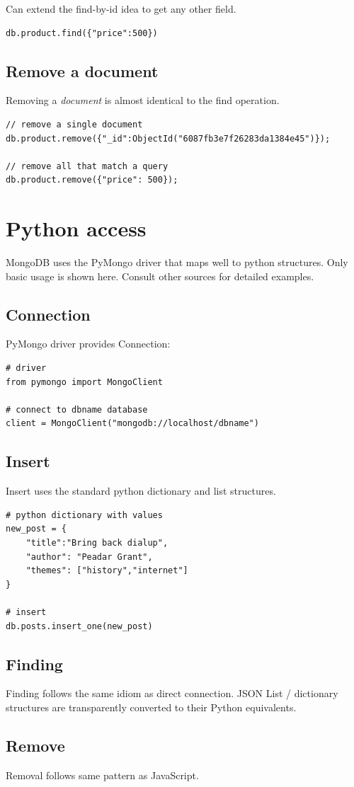 \documentclass[slides]{pgnotes}
\begin{document}
Can extend the find-by-id idea to get any other field.
\begin{verbatim}
db.product.find({"price":500})
\end{verbatim}

\subsection{Remove a document}

Removing a \textit{document} is almost identical to the find operation.

\begin{verbatim}
// remove a single document
db.product.remove({"_id":ObjectId("6087fb3e7f26283da1384e45")});

// remove all that match a query
db.product.remove({"price": 500});
\end{verbatim}

\section{Python access}

MongoDB uses the PyMongo driver that maps well to python structures.
Only basic usage is shown here.
Consult other sources for detailed examples. 

\subsection{Connection}

PyMongo driver provides Connection:
\begin{verbatim}
# driver
from pymongo import MongoClient

# connect to dbname database
client = MongoClient("mongodb://localhost/dbname")
\end{verbatim}

\subsection{Insert}

Insert uses the standard python dictionary and list structures.

\begin{verbatim}
# python dictionary with values
new_post = {
    "title":"Bring back dialup",
    "author": "Peadar Grant",
    "themes": ["history","internet"]
}

# insert
db.posts.insert_one(new_post)
\end{verbatim}

\subsection{Finding}

Finding follows the same idiom as direct connection.
JSON List / dictionary structures are transparently converted to their Python equivalents.

\subsection{Remove}

Removal follows same pattern as JavaScript. 



\end{document}
